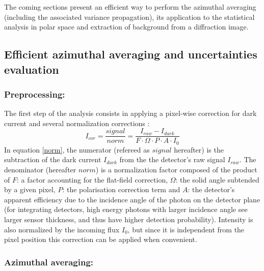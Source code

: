\documentclass[preprint]{iucr}              %
\begin{document}
The coming sections present an efficient way to perform the azimuthal averaging (including the associated variance propagation),  its application to the statistical analysis in polar space and extraction of background from a diffraction image. 

\subsection{Efficient azimuthal averaging and uncertainties evaluation}

\subsubsection{Preprocessing:}
The first step of the analysis consists in applying a pixel-wise correction for dark current and several normalization corrections \cite{pyfai_2020}:
\begin{equation}
\label{norm}
I_{cor} = \frac{signal}{norm}  = \frac{I_{raw} - I_{dark}}{F \cdot
\Omega \cdot P \cdot A \cdot I_0} 
\end{equation}
In  equation \ref{norm}, the numerator (refereed as $signal$ hereafter) is the subtraction of the dark current $I_{dark}$ from the the detector's raw signal $I_{raw}$.
The denominator (hereafter $norm$) is a normalization factor composed of the product of  $F$:  a factor accounting for the flat-field correction, $\Omega$: the solid angle subtended by a given pixel, $P$: the polarisation correction term and $A$: the detector's apparent efficiency due to the incidence angle of the photon on the detector plane (for integrating detectors, high energy photons with larger incidence angle see larger sensor thickness, and thus have higher detection probability).
Intensity is also normalized by the incoming flux $I_0$, but since it is independent from the pixel position this correction can be applied when convenient.

\subsubsection{Azimuthal averaging:} 
\end{document}
